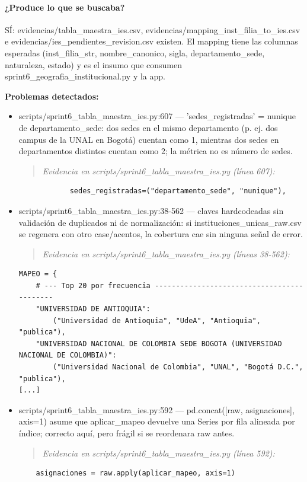 \paragraph{¿Produce lo que se buscaba?}
SÍ: evidencias/tabla\_maestra\_ies.csv, evidencias/mapping\_inst\_filia\_to\_ies.csv e evidencias/ies\_pendientes\_revision.csv existen. El mapping tiene las columnas esperadas (inst\_filia\_str, nombre\_canonico, sigla, departamento\_sede, naturaleza, estado) y es el insumo que consumen sprint6\_geografia\_institucional.py y la app.

\begin{tcolorbox}[riesgo]
\textbf{Problemas detectados:}
\begin{itemize}
  \item scripts/sprint6\_tabla\_maestra\_ies.py:607 --- 'sedes\_registradas' = nunique de departamento\_sede: dos sedes en el mismo departamento (p. ej. dos campus de la UNAL en Bogotá) cuentan como 1, mientras dos sedes en departamentos distintos cuentan como 2; la métrica no es número de sedes.
\begin{quote}\footnotesize\ttfamily
\noindent\emph{Evidencia en scripts/sprint6\_tabla\_maestra\_ies.py (línea 607):}
\end{quote}
\begin{lstlisting}
            sedes_registradas=("departamento_sede", "nunique"),
\end{lstlisting}

  \item scripts/sprint6\_tabla\_maestra\_ies.py:38-562 --- claves hardcodeadas sin validación de duplicados ni de normalización: si instituciones\_unicas\_raw.csv se regenera con otro case/acentos, la cobertura cae sin ninguna señal de error.
\begin{quote}\footnotesize\ttfamily
\noindent\emph{Evidencia en scripts/sprint6\_tabla\_maestra\_ies.py (líneas 38-562):}
\end{quote}
\begin{lstlisting}
MAPEO = {
    # --- Top 20 por frecuencia -------------------------------------------
    "UNIVERSIDAD DE ANTIOQUIA":
        ("Universidad de Antioquia", "UdeA", "Antioquia", "publica"),
    "UNIVERSIDAD NACIONAL DE COLOMBIA SEDE BOGOTA (UNIVERSIDAD NACIONAL DE COLOMBIA)":
        ("Universidad Nacional de Colombia", "UNAL", "Bogotá D.C.", "publica"),
[...]
\end{lstlisting}

  \item scripts/sprint6\_tabla\_maestra\_ies.py:592 --- pd.concat([raw, asignaciones], axis=1) asume que aplicar\_mapeo devuelve una Series por fila alineada por índice; correcto aquí, pero frágil si se reordenara raw antes.
\begin{quote}\footnotesize\ttfamily
\noindent\emph{Evidencia en scripts/sprint6\_tabla\_maestra\_ies.py (línea 592):}
\end{quote}
\begin{lstlisting}
    asignaciones = raw.apply(aplicar_mapeo, axis=1)
\end{lstlisting}


\end{itemize}
\end{tcolorbox}
